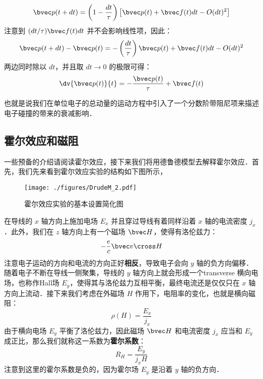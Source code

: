 \begin{equation}
\bvec p(t+dt)=\left(1-\frac{dt}{\tau}\right)\left[\bvec p(t)+\bvec f(t)dt - O(dt)^2\right]
\end{equation}
注意到 $(dt/\tau)\bvec f(t)dt$ 并不会影响线性项，因此：
\begin{equation}
\bvec p(t+dt)-\bvec p(t)=-\left(\frac{dt}{\tau}\right)\bvec p(t)+\bvec f(t)dt - O(dt)^2
\end{equation}
两边同时除以 $dt$，并且取 $dt\rightarrow 0$ 的极限可得：
\begin{equation}\label{DrudeM_eq3}
\dv{\bvec p(t)}{t}= -\frac{\bvec p(t)}{\tau}+\bvec f(t)
\end{equation}

也就是说我们在单位电子的总动量的运动方程中引入了一个分数阶带阻尼项来描述电子碰撞的带来的衰减影响．
\subsection{霍尔效应和磁阻}
一些预备的介绍请阅读霍尔效应，接下来我们将用德鲁德模型去解释霍尔效应．首先，我们先来看到霍尔效应实验的结构如下图所示，
\begin{figure}[ht]
\centering
\texttt{[image: ./figures/DrudeM\_2.pdf]}
\caption{霍尔效应实验的基本设置简化图} \label{DrudeM_fig2}
\end{figure}
在导线的 $x$ 轴方向上施加电场 $E_x$ 并且穿过导线有着同样沿着 $x$ 轴的电流密度 $j_x$．此外，我们在 $z$ 轴方向上有一个磁场 $\bvec H$，使得有洛伦兹力：
\begin{equation}
-\frac{e}{c}\bvec v \cross H
\end{equation}
注意电子运动的方向和电流的方向正好\textbf{相反}，导致电子会向 $y$ 轴的负方向偏移．随着电子不断在导线一侧聚集，导线的 $y$ 轴方向上就会形成一个transverse 横向电场，也称作Hall场 $E_y$，使得其与洛伦兹力互相平衡，最终电流还是仅仅只在 $x$ 轴方向上流动．接下来我们考虑在外磁场 $H$ 作用下，电阻率的变化，也就是横向磁阻：
\begin{equation}
\rho(H)=\frac{E_x}{j_x}
\end{equation}
由于横向电场 $E_y$ 平衡了洛伦兹力，因此磁场 $\bvec H$ 和电流密度 $j_x$ 应当和 $E_y$ 成正比，那么我们就称这一系数为\textbf{霍尔系数}：
\begin{equation}\label{DrudeM_eq5}
R_H = \frac{E_y}{j_xH}
\end{equation}
注意到这里的霍尔系数是负的，因为霍尔场 $E_y$ 是沿着 $y$ 轴的负方向．

